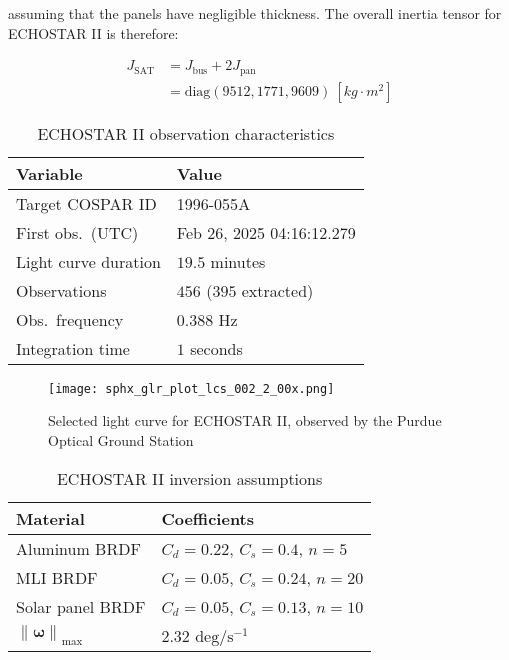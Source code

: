 \documentclass[a4paper,twocolumn]{spaceDebrisC} %
\newcommand{\vctr}[1]{\bm{#1}}
\newcommand{\norm}[1]{\left\lVert#1\right\rVert}
\newcommand{\figbig}[0]{0.5\textwidth}
\begin{document}
\noindent
assuming that the panels have negligible thickness. The overall inertia tensor for ECHOSTAR II is therefore:

\begin{align}
 J_\text{SAT} &= J_\text{bus} + 2J_\text{pan} \\
  &= \text{diag} \left( 9512, 1771, 9609 \right) \: [kg \cdot m^2]
\end{align}


\begin{table}[H]
  \centering
  \caption{ECHOSTAR II observation characteristics}
  \vspace*{6pt}
  \begin{tabular}{|l|l|}
  \hline
  \textbf{Variable} & \textbf{Value} \\ \hline
 Target COSPAR ID & 1996-055A \\ \hline
 First obs.\ (UTC) & Feb 26, 2025 04:16:12.279 \\ \hline
 Light curve duration & $19.5$ minutes \\ \hline
 Observations & $456$ ($395$ extracted) \\ \hline
 Obs.\ frequency & $0.388$ Hz \\ \hline
 Integration time & $1$ seconds \\ \hline
  \end{tabular}
  \label{tb:case2_in}
\end{table}

\begin{figure}[H]
  \centering
  \texttt{[image: sphx\_glr\_plot\_lcs\_002\_2\_00x.png]}
  \caption{Selected light curve for ECHOSTAR II, observed by the Purdue Optical Ground Station}
  \label{fig:sat_lc_obs}
\end{figure}

\begin{table}[H]
  \centering
  \caption{ECHOSTAR II inversion assumptions}
  \vspace*{6pt}
  \begin{tabular}{|l|l|}
  \hline
  \textbf{Material} & \textbf{Coefficients} \\ \hline
 Aluminum BRDF & $C_d=0.22$, $C_s=0.4$, $n=5$ \\ \hline
 MLI BRDF & $C_d=0.05$, $C_s=0.24$, $n=20$ \\ \hline
 Solar panel BRDF & $C_d=0.05$, $C_s=0.13$, $n=10$ \\ \hline
  $\norm{\vctr{\omega}}_\text{max}$ & $2.32$ $\text{deg} / \text{s}^{-1}$ \\ \hline
  \end{tabular}
  \label{tb:case2_ass}
\end{table}
\end{document}
